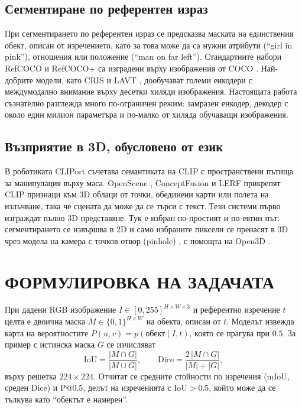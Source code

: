 \documentclass[conference,a4paper]{IEEEtran}
\newcommand{\bgsc}[2]{\texorpdfstring{#1{\footnotesize\MakeUppercase{#2}}}{#1#2}}
\newcommand{\en}[1]{\enquote{#1}}
\begin{document}
\subsection{Сегментиране по референтен израз}

При сегментирането по референтен израз \cite{hu2016segmentation} се предсказва маската на единствения
обект, описан от изречението, като за това може да са нужни атрибути (\en{girl in pink}), отношения
или положение (\en{man on far left}). Стандартните набори RefCOCO и RefCOCO+
\cite{kazemzadeh2014referitgame,yu2016refcoco} са изградени върху изображения от COCO
\cite{lin2014coco}. Най-добрите модели, като CRIS \cite{wang2022cris} и LAVT \cite{yang2022lavt},
дообучават големи енкодери с междумодално внимание върху десетки хиляди изображения. Настоящата работа
съзнателно разглежда много по-ограничен режим: замразен енкодер, декодер с около един милион
параметъра и по-малко от хиляда обучаващи изображения.

\subsection{Възприятие в 3D, обусловено от език}

В роботиката CLIPort \cite{shridhar2021cliport} съчетава семантиката на CLIP с пространствени
пътища за манипулация върху маса. OpenScene \cite{peng2023openscene}, ConceptFusion
\cite{jatavallabhula2023conceptfusion} и LERF \cite{kerr2023lerf} прикрепят CLIP признаци към 3D
облаци от точки, обединени карти или полета на излъчване, така че сцената да може да се търси с
текст. Тези системи първо изграждат пълно 3D представяне. Тук е избран по-простият и по-евтин път:
сегментирането се извършва в 2D и само избраните пиксели се пренасят в 3D чрез модела на камера
с точков отвор (pinhole) \cite{hartley2004mvg}, с помощта на Open3D \cite{zhou2018open3d}.

\section{\bgsc{Ф}{ормулировка на задачата}}
\label{sec:problem}

При дадени RGB изображение $I \in [0,255]^{H\times W\times 3}$ и референтно изречение $t$ целта е
двоична маска $M \in \{0,1\}^{H\times W}$ на обекта, описан от $t$. Моделът извежда карта на
вероятностите $P(u,v) = p(\text{обект} \mid I, t)$, която се прагува при $0.5$. За пример с
истинска маска $G$ се изчисляват
\begin{equation}
\mathrm{IoU} = \frac{|M \cap G|}{|M \cup G|}, \qquad
\mathrm{Dice} = \frac{2\,|M \cap G|}{|M| + |G|},
\label{eq:metrics}
\end{equation}
върху решетка $224\times 224$. Отчитат се средните стойности по изречения (mIoU, среден Dice) и P@0.5, делът
на изреченията с $\mathrm{IoU} > 0.5$, който може да се тълкува като \enquote{обектът е намерен}.
\end{document}
